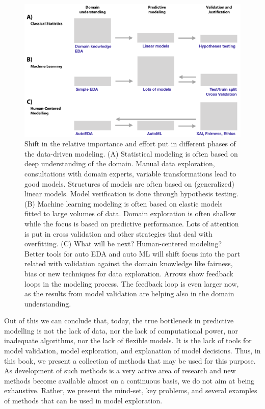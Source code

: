 \documentclass[]{krantz}
\begin{document}
\begin{figure}

{\centering \includegraphics[width=0.9\linewidth]{figure/UMEPImportance} 

}

\caption{Shift in the relative importance and effort put in different phases of the data-driven modeling. (A) Statistical modeling is often based on deep understanding of the domain. Manual data exploration, consultations with domain experts, variable transformations lead to good models. Structures of models are often based on (generalized) linear models. Model verification is done through hypothesis testing. (B) Machine learning modeling is often based on elastic models fitted to large volumes of data. Domain exploration is often shallow while the focus is based on predictive performance. Lots of attention is put in cross validation and other strategies that deal with overfitting. (C) What will be next? Human-centered modeling? Better tools for auto EDA and auto ML will shift focus into the part related with validation against the domain knowledge like fairness, bias or new techniques for data exploration. Arrows show feedback loops in the modeling process. The feedback loop is even larger now, as the results from model validation are helping also in the domain understanding.}\label{fig:UMEPImportance}
\end{figure}

Out of this we can conclude that, today, the true bottleneck in predictive modelling is not the lack of data, nor the lack of computational power, nor inadequate algorithms, nor the lack of flexible models. It is the lack of tools for model validation, model exploration, and explanation of model decisions. Thus, in this book, we present a collection of methods that may be used for this purpose. As development of such methods is a very active area of research and new methods become available almost on a continuous basis, we do not aim at being exhaustive. Rather, we present the mind-set, key problems, and several examples of methods that can be used in model exploration.
\end{document}
